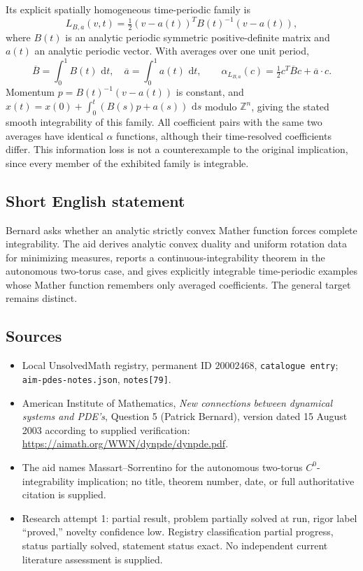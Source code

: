 \documentclass[11pt]{article}
\newcommand{\Z}{\mathbb{Z}}
\newcommand{\dd}{\,\mathrm{d}}
\begin{document}
Its explicit spatially homogeneous time-periodic family is
\[
L_{B,a}(v,t)=\tfrac12(v-a(t))^TB(t)^{-1}(v-a(t)),
\]
where $B(t)$ is an analytic periodic symmetric positive-definite matrix and $a(t)$ an analytic periodic vector. With averages over one unit period,
\[
\overline B=\int_0^1B(t)\,\dd t,\quad \overline a=\int_0^1a(t)\,\dd t,\qquad
\alpha_{L_{B,a}}(c)=\tfrac12c^T\overline Bc+\overline a\cdot c.
\]
Momentum $p=B(t)^{-1}(v-a(t))$ is constant, and $x(t)=x(0)+\int_0^t(B(s)p+a(s))\,\dd s$ modulo $\Z^n$, giving the stated smooth integrability of this family. All coefficient pairs with the same two averages have identical $\alpha$ functions, although their time-resolved coefficients differ. This information loss is not a counterexample to the original implication, since every member of the exhibited family is integrable.
\subsection{Short English statement}
Bernard asks whether an analytic strictly convex Mather function forces complete integrability. The aid derives analytic convex duality and uniform rotation data for minimizing measures, reports a continuous-integrability theorem in the autonomous two-torus case, and gives explicitly integrable time-periodic examples whose Mather function remembers only averaged coefficients. The general target remains distinct.
\subsection{Sources}
\begin{itemize}
\item Local UnsolvedMath registry, permanent ID $20002468$, \texttt{catalogue entry}; \texttt{aim-pdes-notes.json}, \texttt{notes[79]}.
\item American Institute of Mathematics, \emph{New connections between dynamical systems and PDE's}, Question 5 (Patrick Bernard), version dated 15 August 2003 according to supplied verification: \url{https://aimath.org/WWN/dynpde/dynpde.pdf}.
\item The aid names Massart--Sorrentino for the autonomous two-torus $C^0$-integrability implication; no title, theorem number, date, or full authoritative citation is supplied.
\item Research attempt 1: partial result, problem partially solved at run, rigor label ``proved,'' novelty confidence low. Registry classification partial progress, status partially solved, statement status exact. No independent current literature assessment is supplied.
\end{itemize}
\end{document}
